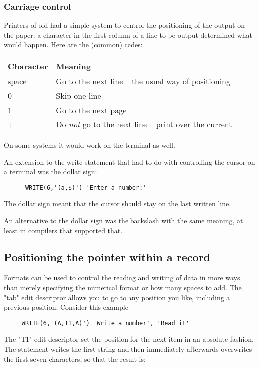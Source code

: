 \subsubsection{Carriage control}
Printers of old had a simple system to control the positioning of the output on the paper:
a character in the first column of a line to be output determined what would happen. Here
are the (common) codes:
\begin{table}[h!]
\begin{tabular}{ll}
\hline
Character    & Meaning \\
\hline
space        & Go to the next line -- the usual way of positioning \\
0            & Skip one line \\
1            & Go to the next page \\
+            & Do \emph{not} go to the next line -- print over the current \\
\end{tabular}
\end{table}

On some systems it would work on the terminal as well.

An extension to the write statement that had to do with controlling the cursor on a
terminal was the dollar sign:
\begin{verbatim}
      WRITE(6,'(a,$)') 'Enter a number:'
\end{verbatim}

The dollar sign meant that the cursor should stay on the last written line.

An alternative to the dollar sign was the backslash with the same meaning, at least
in compilers that supported that.


\subsection*{Positioning the pointer within a record}
Formats can be used to control the reading and writing of data in more ways than merely
specifying the numerical format or how many spaces to add. The "tab" edit descriptor
allows you to go to any position you like, including a previous position. Consider
this example:

\begin{verbatim}
     WRITE(6,'(A,T1,A)') 'Write a number', 'Read it'
\end{verbatim}

The "T1" edit descriptor set the position for the next item in an absolute fashion.
The statement writes the first string and then immediately afterwards overwrites the first
seven characters, so that the result is:


